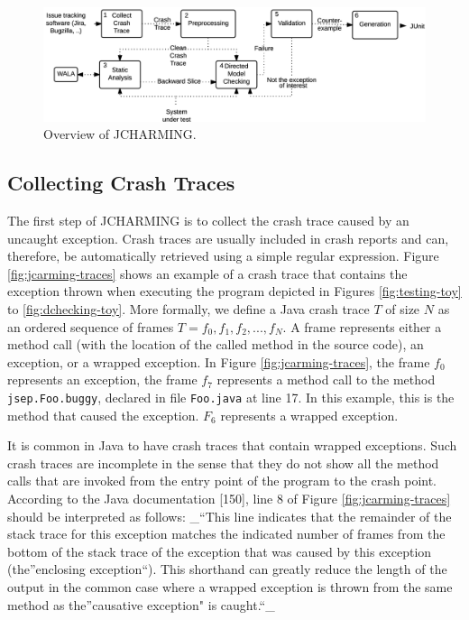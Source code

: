 \documentclass[12pt]{report}
\begin{document}
\begin{figure}
  \centering
    \includegraphics[scale=0.9]{media/chap8/jcharming-approach.png}
    \caption{Overview of JCHARMING.
    \label{fig:jcarming-approach}}
\end{figure}

\subsection{Collecting Crash Traces}\label{collecting-crash-traces}

The first step of JCHARMING is to collect the crash trace caused by an
uncaught exception. Crash traces are usually included in crash reports
and can, therefore, be automatically retrieved using a simple regular
expression. Figure \ref{fig:jcarming-traces} shows an example of a crash
trace that contains the exception thrown when executing the program
depicted in Figures \ref{fig:testing-toy} to \ref{fig:dchecking-toy}.
More formally, we define a Java crash trace \(T\) of size \(N\) as an
ordered sequence of frames \(T={f_0, f_1, f_2, ..., f_N}\). A frame
represents either a method call (with the location of the called method
in the source code), an exception, or a wrapped exception. In Figure
\ref{fig:jcarming-traces}, the frame \(f_0\) represents an exception,
the frame \(f_7\) represents a method call to the method
\texttt{jsep.Foo.buggy}, declared in file \texttt{Foo.java} at line 17.
In this example, this is the method that caused the exception. \(F_6\)
represents a wrapped exception.

It is common in Java to have crash traces that contain wrapped
exceptions. Such crash traces are incomplete in the sense that they do
not show all the method calls that are invoked from the entry point of
the program to the crash point. According to the Java documentation
{[}150{]}, line 8 of Figure \ref{fig:jcarming-traces} should be
interpreted as follows: \_``This line indicates that the remainder of
the stack trace for this exception matches the indicated number of
frames from the bottom of the stack trace of the exception that was
caused by this exception (the''enclosing exception``). This shorthand
can greatly reduce the length of the output in the common case where a
wrapped exception is thrown from the same method as the''causative
exception" is caught.``\_
\end{document}
